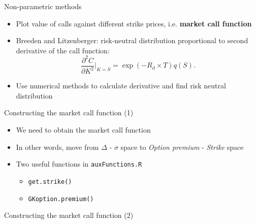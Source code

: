 \begin{frame}{Non-parametric methods}

\begin{itemize}
\tightlist
\item
  Plot value of calls against different strike prices, i.e.
  \textbf{market call function}
\item
  Breeden and Litzenberger: risk-neutral distribution proportional to
  second derivative of the call function: \[
  \frac{\partial^2 C}{\partial K^2} \bigg\rvert_{K=S} = \exp(-R_d \times T)q(S).
  \]
\item
  Use numerical methods to calculate derivative and find risk neutral
  distribution
\end{itemize}

\end{frame}

\begin{frame}[fragile]{Constructing the market call function (1)}

\begin{itemize}
\tightlist
\item
  We need to obtain the market call function
\item
  In other words, move from \(\Delta\) - \(\sigma\) space to
  \emph{Option premium} - \emph{Strike} space
\item
  Two useful functions in \texttt{auxFunctions.R}

  \begin{itemize}
  \tightlist
  \item
    \texttt{get.strike()}
  \item
    \texttt{GKoption.premium()}
  \end{itemize}
\end{itemize}

\end{frame}

\begin{frame}[fragile]{Constructing the market call function (2)}

\begin{Shaded}
\begin{Highlighting}[]
\StringTok{ }
\NormalTok{\{}
\StringTok{ }\OperatorTok{*}\OperatorTok{*}
\StringTok{ }\OperatorTok{*}\OperatorTok{*}
\StringTok{ }\OperatorTok{-}\StringTok{ }\OperatorTok{*}\OperatorTok{*}\OperatorTok{*}
\StringTok{ }\NormalTok{(}\OperatorTok{-}\OperatorTok{*}
\NormalTok{\}}
\end{Highlighting}
\end{Shaded}

\end{frame}

